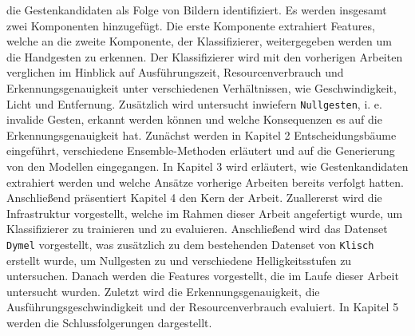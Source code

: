 die Gestenkandidaten als Folge von Bildern identifiziert. Es werden insgesamt zwei Komponenten hinzugefügt. Die erste Komponente extrahiert Features, welche an die zweite Komponente,
der Klassifizierer, weitergegeben werden um die Handgesten zu erkennen. Der Klassifizierer wird mit den vorherigen Arbeiten verglichen im Hinblick auf Ausführungszeit, Resourcenverbrauch
und Erkennungsgenauigkeit unter verschiedenen Verhältnissen, wie Geschwindigkeit, Licht und Entfernung. Zusätzlich wird untersucht inwiefern \texttt{Nullgesten}, i. e. invalide Gesten,
erkannt werden können und welche Konsequenzen es auf die Erkennungsgenauigkeit hat.
\newline
\newline
Zunächst werden in Kapitel 2 Entscheidungsbäume eingeführt, verschiedene Ensemble-Methoden erläutert und auf die Generierung von den Modellen eingegangen.
In Kapitel 3 wird erläutert, wie Gestenkandidaten extrahiert werden und welche Ansätze vorherige Arbeiten bereits verfolgt hatten.
Anschließend präsentiert Kapitel 4 den Kern der Arbeit. Zuallererst wird die Infrastruktur vorgestellt, welche im Rahmen dieser Arbeit angefertigt wurde, um
Klassifizierer zu trainieren und zu evaluieren. Anschließend wird das Datenset \texttt{Dymel} vorgestellt, was zusätzlich zu dem bestehenden Datenset von \texttt{Klisch}
erstellt wurde, um Nullgesten zu und verschiedene Helligkeitsstufen zu untersuchen. Danach werden die Features vorgestellt, die im Laufe dieser Arbeit untersucht wurden.
Zuletzt wird die Erkennungsgenauigkeit, die Ausführungsgeschwindigkeit und der Resourcenverbrauch evaluiert.
In Kapitel 5 werden die Schlussfolgerungen dargestellt.